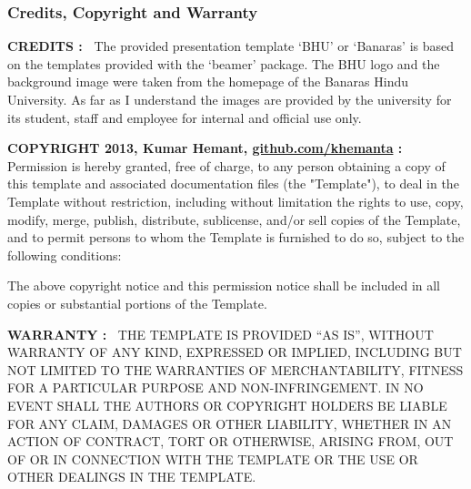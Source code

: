 \documentclass[]{beamer} %
\begin{document}
\begin{frame}
\frametitle{Credits, Copyright and Warranty}

\tiny
\textbf{CREDITS :~}%
The provided presentation template `BHU' or `Banaras' is based on the
templates provided with the `beamer' package. The BHU
logo and the background image were taken from the homepage
of the Banaras Hindu University. As far as I understand the images
are provided by the university for its student, staff and employee for internal
and official use only.


\bigskip %

\textbf{COPYRIGHT 2013, Kumar Hemant, \url{github.com/khemanta} :~}%
Permission is hereby granted, free of charge, to any person
obtaining a copy of this template and associated
documentation files (the "Template"), to deal in the Template
without restriction, including without limitation the rights to
use, copy, modify, merge, publish, distribute, sublicense,
and/or sell copies of the Template, and to permit persons to
whom the Template is furnished to do so, subject to the
following conditions:

\medskip %

The above copyright notice and this permission notice shall be
included in all copies or substantial portions of the Template.

\bigskip

\textbf{WARRANTY :~}%
\uppercase{The Template is provided ``As Is'', without warranty of any
kind, expressed or implied, including but not limited to the
warranties of merchantability, fitness for a particular purpose and
non-infringement. In no event shall the authors or copyright holders be
liable for any claim, damages or other liability, whether in an action
of contract, tort or otherwise, arising from, out of or in connection
with the template or the use or other dealings in the template.}

\end{frame}
\end{document}

